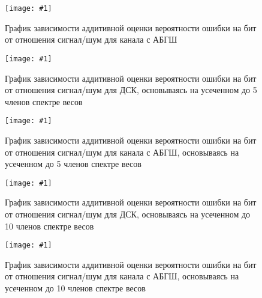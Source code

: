 \documentclass{article}
\newcommand{\image}[3]{%
    \begin{figure}[H]
        \centering
        \texttt{[image: \#1]}
        \caption{#2}
        \label{img:#1}
    \end{figure}
}
\begin{document}
\image {ABGSH.png} {График зависимости аддитивной оценки вероятности ошибки на бит от отношения сигнал/шум для канала с АБГШ} {0.6\textwidth}
\image {DSK5.png} {График зависимости аддитивной оценки вероятности ошибки на бит от отношения сигнал/шум для ДСК, основываясь на усеченном до 5 членов спектре весов} {0.6\textwidth}
\image {ABGSH5.png} {График зависимости аддитивной оценки вероятности ошибки на бит от отношения сигнал/шум для канала с АБГШ, основываясь на усеченном до 5 членов спектре весов} {0.6\textwidth}
\image {DSK10.png} {График зависимости аддитивной оценки вероятности ошибки на бит от отношения сигнал/шум для ДСК, основываясь на усеченном до 10 членов спектре весов} {0.6\textwidth}
\image {ABGSH10.png} {График зависимости аддитивной оценки вероятности ошибки на бит от отношения сигнал/шум для канала с АБГШ, основываясь на усеченном до 10 членов спектре весов} {0.6\textwidth}
\end{document}
